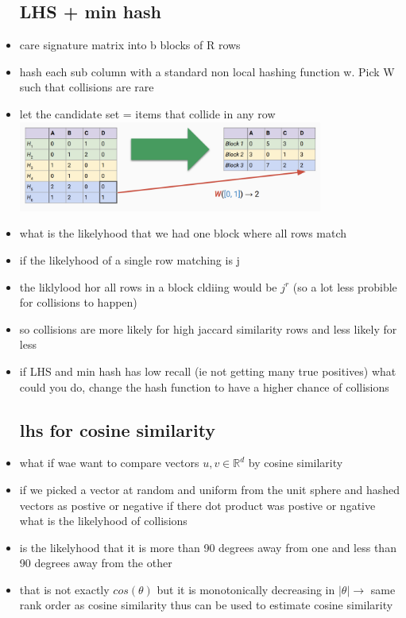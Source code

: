 \documentclass{article}
\begin{document}
\begin{itemize}
\subsection*{LHS + min hash}
\item care signature matrix into b blocks of R rows 
\item hash each sub column with a standard non local hashing function w. Pick W such that collisions are rare 
\item let the candidate set = items that collide in any row \\
\includegraphics*[width=10cm]{images/Screenshot 2023-05-11 at 2.22.48 AM.png}
\item what is the likelyhood that we had one block where all rows match 
\item if the likelyhood of a single row matching is j 
\item the liklylood hor all rows in a block cldiing would be $j^r$ (so a lot less probible for collisions to happen)
\item  so collisions are more likely for high jaccard similarity rows and less likely for less
\item if LHS and min hash has low recall (ie not getting many true positives) what could you do, change the hash function to have a higher chance of collisions
\subsection*{lhs for cosine similarity}
\item what if wae want to compare vectors $u,v \in \mathbb{R}^{d}$ by cosine similarity
\item if we picked a vector at random and uniform from the unit sphere and hashed vectors as postive or negative if there dot product was postive or ngative what is the likelyhood of collisions
\item is the likelyhood that it is more than 90 degrees away from one and less than 90 degrees away from the other 
\item that is not exactly $cos(\theta)$ but it is monotonically decreasing in $|\theta|\rightarrow$ same rank order as cosine similarity thus can be used to estimate cosine similarity

\end{itemize}
\end{document}
